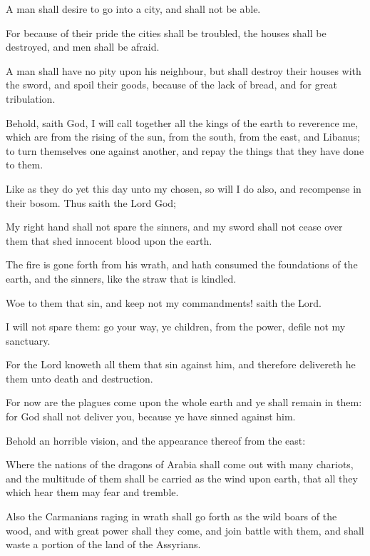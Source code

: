 {\par }{\PP {}A man shall desire to go into a city, and shall not be able.
\par }{\PP {}For because of their pride the cities shall be troubled, the houses shall be destroyed, and men shall be afraid.
\par }{\PP {}A man shall have no pity upon his neighbour, but shall destroy their houses with the sword, and spoil their goods, because of the lack of bread, and for great tribulation.
\par }{\PP {}Behold, saith God, I will call together all the kings of the earth to reverence me, which are from the rising of the sun, from the south, from the east, and Libanus; to turn themselves one against another, and repay the things that they have done to them.
\par }{\PP {}Like as they do yet this day unto my chosen, so will I do also, and recompense in their bosom. Thus saith the Lord God;
\par }{\PP {}My right hand shall not spare the sinners, and my sword shall not cease over them that shed innocent blood upon the earth.
\par }{\PP {}The fire is gone forth from his wrath, and hath consumed the foundations of the earth, and the sinners, like the straw that is kindled.
\par }{\PP {}Woe to them that sin, and keep not my commandments! saith the Lord.
\par }{\PP {}I will not spare them: go your way, ye children, from the power, defile not my sanctuary.
\par }{\PP {}For the Lord knoweth all them that sin against him, and therefore delivereth he them unto death and destruction.
\par }{\PP {}For now are the plagues come upon the whole earth and ye shall remain in them: for God shall not deliver you, because ye have sinned against him.
\par }{\PP {}Behold an horrible vision, and the appearance thereof from the east:
\par }{\PP {}Where the nations of the dragons of Arabia shall come out with many chariots, and the multitude of them shall be carried as the wind upon earth, that all they which hear them may fear and tremble.
\par }{\PP {}Also the Carmanians raging in wrath shall go forth as the wild boars of the wood, and with great power shall they come, and join battle with them, and shall waste a portion of the land of the Assyrians.
}
